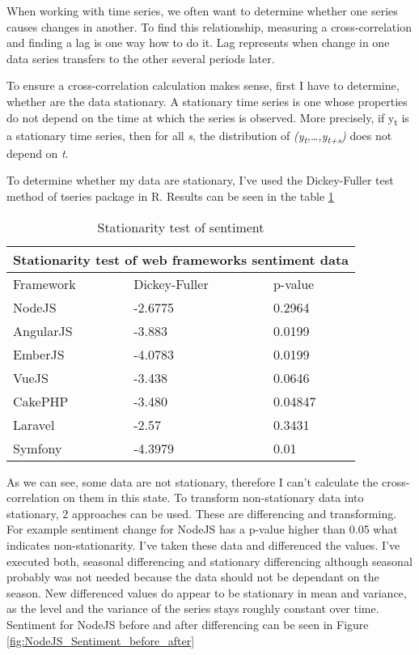 When working with time series, we often want to determine whether one series causes changes in another. To find this relationship, measuring a cross-correlation and finding a lag is one way how to do it. Lag represents when change in one data series transfers to the other several periods later. 

To ensure a cross-correlation calculation makes sense, first I have to determine, whether are the data stationary. A stationary time series is one whose properties do not depend on the time at which the series is observed\cite{hyndman5forecast}. More precisely, if y\textsubscript{t} is a stationary time series, then for all \textit{s}, the distribution of \textit{(y\textsubscript{t},…,y\textsubscript{t+s})} does not depend on \textit{t}.

To determine whether my data are stationary, I've used the Dickey-Fuller test method of tseries package in R. Results can be seen in the table \ref{table:stationarity_table} 

\begin{table}
\centering
\begin{tabular}{ |p{3cm}||p{3cm}|p{3cm}|  }
 \hline
 \multicolumn{3}{|c|}{Stationarity test of web frameworks sentiment data} \\
 \hline
 Framework & Dickey-Fuller & p-value\\
 \hline
 NodeJS   & -2.6775    &0.2964\\ \hline
 AngularJS &   -3.883  & 0.0199\\ \hline
 EmberJS & -4.0783 & 0.0199\\ \hline
 VueJS    &-3.438 & 0.0646\\ \hline
 CakePHP&   -3.480  & 0.04847\\ \hline
 Laravel& -2.57  & 0.3431\\ \hline
 Symfony& -4.3979  & 0.01\\ \hline
\end{tabular}
\caption{Stationarity test of sentiment}
\label{table:stationarity_table}
\end{table}

As we can see, some data are not stationary, therefore I can't calculate the cross-correlation on them in this state. To transform non-stationary data into stationary, 2 approaches can be used. These are differencing and transforming. For example sentiment change for NodeJS has a p-value higher than 0.05 what indicates non-stationarity. I've taken these data and differenced the values. I've executed both, seasonal differencing and stationary differencing although seasonal probably was not needed because the data should not be dependant on the season. New differenced values do appear to be stationary in mean and variance, as the level and the variance of the series stays roughly constant over time. Sentiment for NodeJS before and after differencing can be seen in Figure \ref{fig:NodeJS_Sentiment_before_after}

